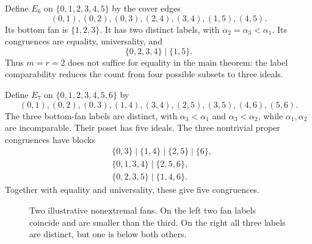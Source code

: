 \documentclass[11pt,a4paper]{article}
\numberwithin{equation}{section}
\theoremstyle{definition}
\theoremstyle{remark}
\begin{document}
Define $E_6$ on $\{0,1,2,3,4,5\}$ by the cover edges
\[
 (0,1),(0,2),(0,3),(2,4),(3,4),(1,5),(4,5).
\]
Its bottom fan is $\{1,2,3\}$. It has two distinct labels, with
$\alpha_2=\alpha_3<\alpha_1$. Its congruences are equality, universality, and
\[
 \{0,2,3,4\}\mid\{1,5\}.
\]
Thus $m=r=2$ does not suffice for equality in the main theorem: the label
comparability reduces the count from four possible subsets to three ideals.

Define $E_7$ on $\{0,1,2,3,4,5,6\}$ by
\[
 (0,1),(0,2),(0,3),(1,4),(3,4),(2,5),(3,5),(4,6),(5,6).
\]
The three bottom-fan labels are distinct, with
$\alpha_3<\alpha_1$ and $\alpha_3<\alpha_2$, while
$\alpha_1,\alpha_2$ are incomparable. Their poset has five ideals.
The three nontrivial proper congruences have blocks
\begin{align*}
 &\{0,3\}\mid\{1,4\}\mid\{2,5\}\mid\{6\},\\
 &\{0,1,3,4\}\mid\{2,5,6\},\\
 &\{0,2,3,5\}\mid\{1,4,6\}.
\end{align*}
Together with equality and universality, these give five congruences.

\begin{figure}[htbp]
\centering
{}
\caption{Two illustrative nonextremal fans. On the left two fan labels coincide
and are smaller than the third. On the right all three labels are distinct,
but one is below both others.}
\label{fig:examples}
\end{figure}
\end{document}
